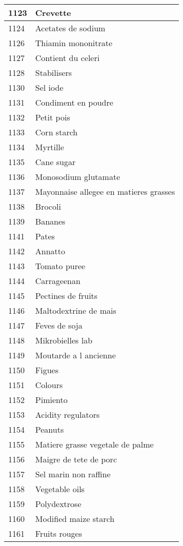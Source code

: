 \begin{longtable}{|l|l|}
1123 & Crevette \\ \hline 
1124 & Acetates de sodium \\ \hline 
1126 & Thiamin mononitrate \\ \hline 
1127 & Contient du celeri \\ \hline 
1128 & Stabilisers \\ \hline 
1130 & Sel iode \\ \hline 
1131 & Condiment en poudre \\ \hline 
1132 & Petit pois \\ \hline 
1133 & Corn starch \\ \hline 
1134 & Myrtille \\ \hline 
1135 & Cane sugar \\ \hline 
1136 & Monosodium glutamate \\ \hline 
1137 & Mayonnaise allegee en matieres grasses \\ \hline 
1138 & Brocoli \\ \hline 
1139 & Bananes \\ \hline 
1141 & Pates \\ \hline 
1142 & Annatto \\ \hline 
1143 & Tomato puree \\ \hline 
1144 & Carrageenan \\ \hline 
1145 & Pectines de fruits \\ \hline 
1146 & Maltodextrine de mais \\ \hline 
1147 & Feves de soja \\ \hline 
1148 & Mikrobielles lab \\ \hline 
1149 & Moutarde a l ancienne \\ \hline 
1150 & Figues \\ \hline 
1151 & Colours \\ \hline 
1152 & Pimiento \\ \hline 
1153 & Acidity regulators \\ \hline 
1154 & Peanuts \\ \hline 
1155 & Matiere grasse vegetale de palme \\ \hline 
1156 & Maigre de tete de porc \\ \hline 
1157 & Sel marin non raffine \\ \hline 
1158 & Vegetable oils \\ \hline 
1159 & Polydextrose \\ \hline 
1160 & Modified maize starch \\ \hline 
1161 & Fruits rouges \\ \hline 

\end{longtable}
